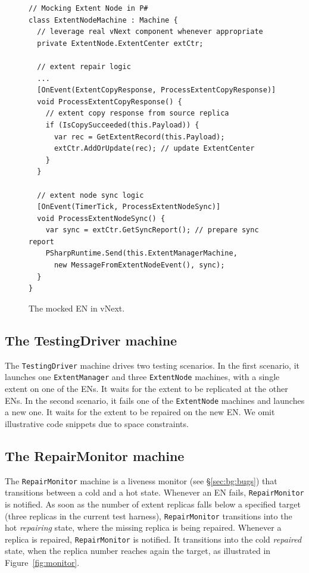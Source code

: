 \begin{figure}[t]
\begin{lstlisting}
// Mocking Extent Node in P#
class ExtentNodeMachine : Machine {
  // leverage real vNext component whenever appropriate
  private ExtentNode.ExtentCenter extCtr;

  // extent repair logic
  ...
  [OnEvent(ExtentCopyResponse, ProcessExtentCopyResponse)]
  void ProcessExtentCopyResponse() {
    // extent copy response from source replica
    if (IsCopySucceeded(this.Payload)) {
      var rec = GetExtentRecord(this.Payload);
      extCtr.AddOrUpdate(rec); // update ExtentCenter
    }
  }

  // extent node sync logic
  [OnEvent(TimerTick, ProcessExtentNodeSync)]
  void ProcessExtentNodeSync() {
    var sync = extCtr.GetSyncReport(); // prepare sync report
    PSharpRuntime.Send(this.ExtentManagerMachine,
      new MessageFromExtentNodeEvent(), sync);
  }
}
\end{lstlisting}
\vspace{-2mm}
\caption{The mocked EN in vNext.}
\label{fig:mocked_en}
\end{figure}

\subsection{The TestingDriver machine}
\label{sec:method:driver}

The \texttt{TestingDriver} machine drives two testing scenarios. In the first scenario, it launches one \texttt{ExtentManager} and three \texttt{ExtentNode} machines, with a single extent on one of the ENs. It waits for the extent to be replicated at the other ENs. In the second scenario, it fails one of the \texttt{ExtentNode} machines and launches a new one. It waits for the extent to be repaired on the new EN. We omit illustrative code snippets due to space constraints.

\subsection{The RepairMonitor machine}
\label{sec:method:monitor}

The \texttt{RepairMonitor} machine is a \psharp liveness monitor (see \S\ref{sec:bg:bugs}) that transitions between a cold and a hot state. Whenever an EN fails, \texttt{RepairMonitor} is notified. As soon as the number of extent replicas falls below a specified target (three replicas in the current \psharp test harness), \texttt{RepairMonitor} transitions into the hot \emph{repairing} state, where the missing replica is being repaired. Whenever a replica is repaired, \texttt{RepairMonitor} is notified. It transitions into the cold \emph{repaired} state, when the replica number reaches again the target, as illustrated in Figure~\ref{fig:monitor}.

